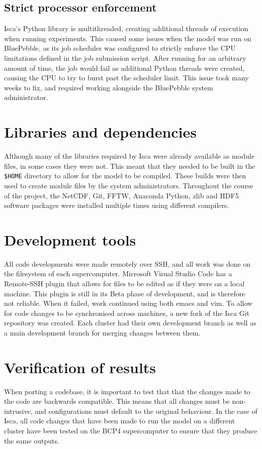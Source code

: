 \documentclass[a4paper,11pt]{report}
\begin{document}
\subsection{Strict processor enforcement}
Isca's Python library is multithreaded, creating additional threads of execution when running experiments. This caused some issues when the model was run on BluePebble, as its job scheduler was configured to strictly enforce the CPU limitations defined in the job submission script. After running for an arbitrary amount of time, the job would fail as additional Python threads were created, causing the CPU to try to burst past the scheduler limit. This issue took many weeks to fix, and required working alongside the BluePebble system administrator. 



\section{Libraries and dependencies}
Although many of the libraries required by Isca were already available as module files, in some cases they were not. This meant that they needed to be built in the \texttt{\$HOME} directory to allow for the model to be compiled. These builds were then used to create module files by the system administrators. Throughout the course of the project, the NetCDF, Git, FFTW, Anaconda Python, zlib and HDF5 software packages were installed multiple times using different compilers. 

\section{Development tools}
All code developments were made remotely over SSH, and all work was done on the filesystem of each supercomputer. Microsoft Visual Studio Code has a Remote-SSH plugin that allows for files to be edited as if they were on a local machine. This plugin is still in its Beta phase of development, and is therefore not reliable. When it failed, work continued using both emacs and vim. To allow for code changes to be synchronised across machines, a new fork of the Isca Git repository was created. Each cluster had their own development branch as well as a main development branch for merging changes between them. 



\section{Verification of results}
When porting a codebase, it is important to test that that the changes made to the code are backwards compatible. This means that all changes must be non-intrusive, and configurations must default to the original behaviour. In the case of Isca, all code changes that have been made to run the model on a different cluster have been tested on the BCP4 supercomputer to ensure that they produce the same outputs.
\end{document}
